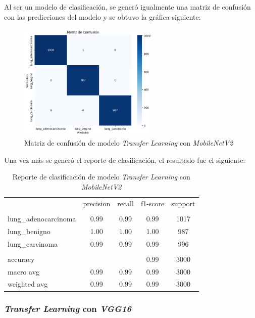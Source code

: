 Al ser un modelo de clasificación, se generó igualmente una matriz de confusión con las predicciones del modelo y se obtuvo la gráfica siguiente:

\begin{figure}[H]
    \centering
    \includegraphics[width=0.60\textwidth]{Francisco/Imagenes resultados/CMCNN1.jpeg} 
    \caption{Matriz de confusión de modelo \textit{Transfer Learning} con \textit{MobileNetV2}}
\end{figure}

Una vez más se generó el reporte de clasificación, el resultado fue el siguiente:

\begin{table}[H]
    \centering
    \begin{tabular}{l c c c c}

         & precision & recall & f1-score & support \\
        \\
        lung\_adenocarcinoma & 0.99 & 0.99 & 0.99 & 1017 \\
        lung\_benigno & 1.00 & 1.00 & 1.00 & 987 \\
        lung\_carcinoma & 0.99 & 0.99 & 0.99 & 996 \\
        \\
        accuracy &  &  & 0.99 & 3000 \\
        macro avg & 0.99 & 0.99 & 0.99 & 3000 \\
        weighted avg & 0.99 & 0.99 & 0.99 & 3000
    
    \end{tabular}
    \caption{Reporte de clasificación de modelo \textit{Transfer Learning} con \textit{MobileNetV2}}
\end{table}

\subsubsection{\textit{Transfer Learning} con \textit{VGG16}}

